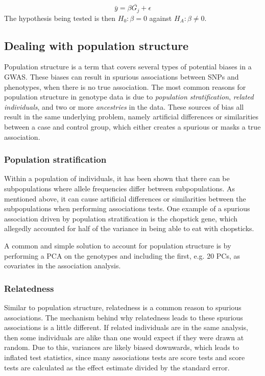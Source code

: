 \begin{equation}\label{eq:univarGWAS}
\bar{y} = \beta \bar{G_j} + \epsilon
\end{equation}
The hypothesis being tested is then $ H_0: \beta = 0 $ against $ H_A: \beta \neq 0 $. 

\subsection{Dealing with population structure}
Population structure is a term that covers several types of potential biases in a GWAS. These biases can result in spurious associations between SNPs and phenotypes, when there is no true association. The most common reasons for population structure in genotype data is due to \textit{population stratification}, \textit{related individuals}, and two or more \textit{ancestries} in the data. These sources of bias all result in the same underlying problem, namely artificial differences or similarities between a case and control group, which either creates a spurious or masks a true association. 

\subsubsection{Population stratification}
Within a population of individuals, it has been shown that there can be subpopulations where allele frequencies differ between subpopulations. As mentioned above, it can cause artificial differences or similarities between the subpopulations when performing associations tests. One example of a spurious association driven by population stratification is the chopstick gene, which allegedly accounted for half of the variance in being able to eat with chopsticks.\cite{marees2018tutorial} 

A common and simple solution to account for population structure is by performing a PCA on the genotypes and including the first, e.g. 20 PCs, as covariates in the association analysis. 

\subsubsection{Relatedness}
Similar to population structure, relatedness is a common reason to spurious associations. The mechanism behind why relatedness leads to these spurious associations is a little different. If related individuals are in the same analysis, then some individuals are alike than one would expect if they were drawn at random. Due to this, variances are likely biased downwards, which leads to inflated test statistics, since many associations tests are score tests and score tests are calculated as the effect estimate divided by the standard error. 

